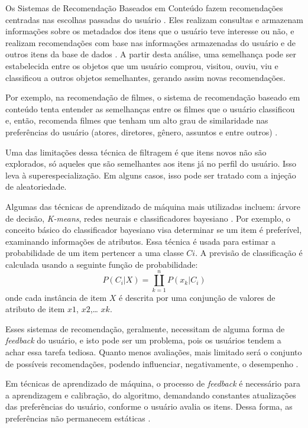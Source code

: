 Os Sistemas de Recomendação Baseados em Conteúdo fazem recomendações centradas nas escolhas passadas do usuário \cite{bobadilla2013}. 
Eles realizam consultas e armazenam informações sobre os metadados dos itens que o usuário teve interesse ou não, e realizam recomendações 
com base nas informações armazenadas do usuário e de outros itens da base de dados \cite{mauricio}. A partir desta análise, uma semelhança pode ser
estabelecida entre os objetos que um usuário comprou, visitou, ouviu, viu e classificou a outros objetos semelhantes, gerando assim novas recomendações. 

Por exemplo, na recomendação de filmes, o sistema de recomendação baseado em conteúdo 
tenta entender as semelhanças entre os filmes que o usuário classificou e, então, recomenda filmes 
que tenham um alto grau de similaridade nas preferências do usuário (atores, diretores, gênero, assuntos e entre outros) \cite{adomavicius2005}.

Uma das limitações dessa técnica de filtragem é que itens novos não são explorados, só aqueles que são semelhantes 
aos itens já no perfil do usuário. Isso leva à superespecialização. Em alguns casos, isso pode ser tratado com a 
injeção de aleatoriedade\cite{paulson2003}.


Algumas das técnicas de aprendizado de máquina mais utilizadas incluem: árvore de decisão, \emph{K-means}, redes neurais e classificadores 
bayesiano \cite{son2017}. Por exemplo, o conceito básico do classificador bayesiano visa determinar se um item é preferível, examinando informações de 
atributos. Essa técnica é usada para estimar a probabilidade de um item 
pertencer a uma classe $Ci$. A previsão de classificação é calculada usando a 
seguinte função de probabilidade:
\begin{equation}
	P(C_{i}|X) = \coprod _{k=1}^{n} P(x_{k}|C_{i})
\end{equation}
onde cada instância de item $X$ é descrita por uma conjunção de valores de atributo de item $x1$, $x2$,… $xk$. 


Esses sistemas de recomendação, geralmente, necessitam de alguma forma de \emph{feedback} do usuário, e isto pode ser 
um problema, pois os usuários tendem a achar essa tarefa tediosa. Quanto menos avaliações, mais limitado 
será o conjunto de possíveis recomendações, podendo influenciar, negativamente, o desempenho \cite{paulson2003}. 

Em técnicas de aprendizado de máquina, o processo de \emph{feedback} é necessário para a aprendizagem e calibração, 
do algoritmo, demandando constantes atualizações das preferências do usuário, conforme o usuário avalia os itens. Dessa forma, 
as preferências não permanecem estáticas \cite{paulson2003}. 



